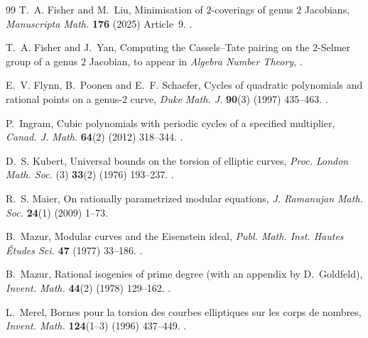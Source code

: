 \documentclass[11pt,a4paper]{amsart}
\theoremstyle{definition}
\theoremstyle{remark}
\numberwithin{equation}{section}
\begin{document}
\begin{thebibliography}{99}
T.~A. Fisher and M.~Liu, Minimisation of $2$-coverings of genus $2$
  Jacobians, \textit{Manuscripta Math.} \textbf{176} (2025) Article~9.
\newblock \href{https://doi.org/10.1007/s00229-024-01602-x}
  {}.

T.~A. Fisher and J.~Yan, Computing the Cassels--Tate pairing on the
  $2$-Selmer group of a genus $2$ Jacobian, to appear in \textit{Algebra
  Number Theory}, \href{https://arxiv.org/abs/2306.06011}
  {}.

E.~V. Flynn, B.~Poonen and E.~F. Schaefer, Cycles of quadratic polynomials and
  rational points on a genus-$2$ curve, \textit{Duke Math. J.}
  \textbf{90}(3) (1997) 435--463.
\newblock \href{https://doi.org/10.1215/S0012-7094-97-09011-6}
  {}.

P.~Ingram, Cubic polynomials with periodic cycles of a specified multiplier,
  \textit{Canad. J. Math.} \textbf{64}(2) (2012) 318--344.
\newblock \href{https://doi.org/10.4153/CJM-2011-093-8}
  {}.

D.~S. Kubert, Universal bounds on the torsion of elliptic curves,
  \textit{Proc. London Math. Soc.} (3) \textbf{33}(2) (1976) 193--237.
\newblock \href{https://doi.org/10.1112/plms/s3-33.2.193}
  {}.

R.~S. Maier, On rationally parametrized modular equations,
  \textit{J. Ramanujan Math. Soc.} \textbf{24}(1) (2009) 1--73.

B.~Mazur, Modular curves and the Eisenstein ideal, \textit{Publ. Math. Inst.
  Hautes \'{E}tudes Sci.} \textbf{47} (1977) 33--186.
\newblock \href{https://doi.org/10.1007/BF02684339}
  {}.

B.~Mazur, Rational isogenies of prime degree (with an appendix by D.~Goldfeld),
  \textit{Invent. Math.} \textbf{44}(2) (1978) 129--162.
\newblock \href{https://doi.org/10.1007/BF01390348}
  {}.

L.~Merel, Bornes pour la torsion des courbes elliptiques sur les corps de
  nombres, \textit{Invent. Math.} \textbf{124}(1--3) (1996) 437--449.
\newblock \href{https://doi.org/10.1007/s002220050059}
  {}.


\end{thebibliography}
\end{document}
